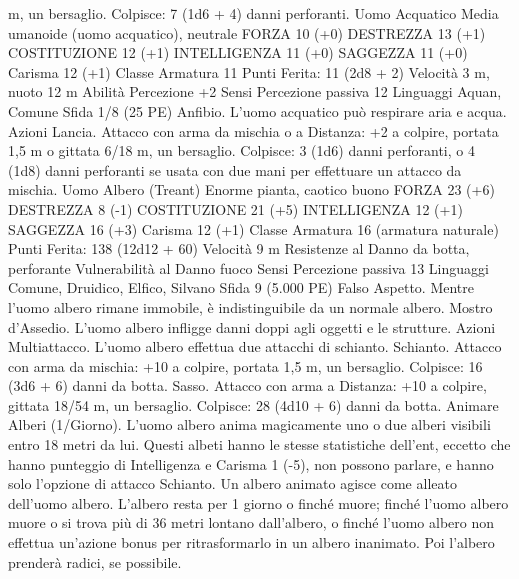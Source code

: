 \begin{multicols}{2}
m, un bersaglio.
Colpisce: 7 (1d6 + 4) danni perforanti.
Uomo Acquatico
Media umanoide (uomo acquatico), neutrale
FORZA 10 (+0)
DESTREZZA 13 (+1)
COSTITUZIONE 12 (+1)
INTELLIGENZA 11 (+0)
SAGGEZZA 11 (+0)
Carisma 12 (+1)
Classe Armatura 11
\hspace*{0pt}\hfill{Punti Ferita}: 11 (2d8 + 2)
Velocità 3 m, nuoto 12 m
Abilità Percezione +2
Sensi Percezione passiva 12
Linguaggi Aquan, Comune
Sfida 1/8 (25 PE)
Anfibio. L’uomo acquatico può respirare aria e acqua.
Azioni
Lancia. Attacco con arma da mischia o a Distanza: +2 a colpire,
portata 1,5 m o gittata 6/18 m, un bersaglio.
Colpisce: 3 (1d6) danni perforanti, o 4 (1d8) danni perforanti se
usata con due mani per effettuare un attacco da mischia.
Uomo Albero (Treant)
Enorme pianta, caotico buono
FORZA 23 (+6)
DESTREZZA 8 (-1)
COSTITUZIONE 21 (+5)
INTELLIGENZA 12 (+1)
SAGGEZZA 16 (+3)
Carisma 12 (+1)
Classe Armatura 16 (armatura naturale)
\hspace*{0pt}\hfill{Punti Ferita}: 138 (12d12 + 60)
Velocità 9 m
Resistenze al Danno da botta, perforante
Vulnerabilità al Danno fuoco
Sensi Percezione passiva 13
Linguaggi Comune, Druidico, Elfico, Silvano
Sfida 9 (5.000 PE)
Falso Aspetto. Mentre l’uomo albero rimane immobile, è
indistinguibile da un normale albero.
Mostro d’Assedio. L’uomo albero infligge danni doppi agli
oggetti e le strutture.
Azioni
Multiattacco. L’uomo albero effettua due attacchi di schianto.
Schianto. Attacco con arma da mischia: +10 a colpire, portata
1,5 m, un bersaglio.
Colpisce: 16 (3d6 + 6) danni da botta.
Sasso. Attacco con arma a Distanza: +10 a colpire, gittata 18/54
m, un bersaglio.
Colpisce: 28 (4d10 + 6) danni da botta.
Animare Alberi (1/Giorno). L’uomo albero anima magicamente
uno o due alberi visibili entro 18 metri da lui. Questi albeti hanno
le stesse statistiche dell’ent, eccetto che hanno punteggio di
Intelligenza e Carisma 1 (-5), non possono parlare, e hanno solo
l’opzione di attacco Schianto. Un albero animato agisce come
alleato dell’uomo albero. L’albero resta per 1 giorno o finché
muore; finché l’uomo albero muore o si trova più di 36 metri
lontano dall’albero, o finché l’uomo albero non effettua
un’azione bonus per ritrasformarlo in un albero inanimato. Poi
l’albero prenderà radici, se possibile.
 

\end{multicols}
